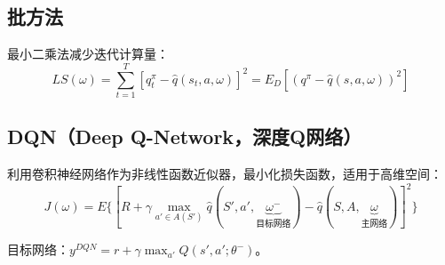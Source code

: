 \documentclass[
12pt, %
a4paper, 
oneside, %
headinclude,footinclude, %
]{scrartcl}
\begin{document}
\subsection[批方法]{批方法}
最小二乘法减少迭代计算量：
$$ LS(\omega) = \sum_{t = 1}^{T}[q_t^{\pi} - \hat{q}(s_t, a, \omega)]^2 = E_D[(q^{\pi} - \hat{q}(s, a, \omega))^2] $$
\subsection[DQN]{DQN（Deep Q-Network，深度Q网络）}
利用卷积神经网络作为非线性函数近似器，最小化损失函数，适用于高维空间：
$$ J(\omega) = E\{[R + \gamma \max_{a' \in A(S')} \hat{q}(S', a', \underbrace{\omega^-}_{\text{目标网络}}) - \hat{q}(S, A, \underbrace{\omega}_{\text{主网络}})]^2\} $$

目标网络：$ y^{DQN} = r + \gamma \max_{a'} Q(s', a'; \theta^-) $。
\end{document}
